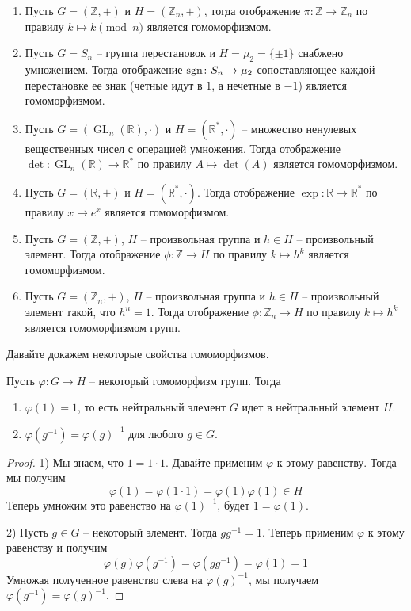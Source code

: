 \begin{examples}
\begin{enumerate}
\item Пусть $G = (\mathbb Z, +)$ и $H = (\mathbb Z_n, +)$, тогда отображение $\pi\colon \mathbb Z\to \mathbb Z_n$ по правилу $k \mapsto k \pmod n$ является гомоморфизмом.

\item Пусть $G = S_n$ -- группа перестановок и $H = \mu_2 = \{\pm 1\}$ снабжено умножением.
Тогда отображение $\operatorname{sgn} \colon S_n \to \mu_2$ сопоставляющее каждой перестановке ее знак (четные идут в $1$, а нечетные в $-1$) является гомоморфизмом.

\item Пусть $G = (\operatorname{GL}_n(\mathbb R),\cdot)$ и $H = (\mathbb R^*, \cdot)$ -- множество ненулевых вещественных чисел с операцией умножения.
Тогда отображение $\det \colon \operatorname{GL}_n(\mathbb R) \to \mathbb R^*$ по правилу $A \mapsto \det(A)$ является гомоморфизмом.

\item Пусть $G = (\mathbb R, +)$ и $H = (\mathbb R^*, \cdot)$.
Тогда отображение $\exp\colon \mathbb R\to \mathbb R^*$ по правилу $x \mapsto e^x$ является гомоморфизмом.

\item Пусть $G = (\mathbb Z, +)$, $H$ -- произвольная группа и $h\in H$ -- произвольный элемент.
Тогда отображение $\phi\colon \mathbb Z \to H$ по правилу $k \mapsto h^k$ является гомоморфизмом.

\item Пусть $G = (\mathbb Z_n, +)$, $H$ -- произвольная группа и $h\in H$ -- произвольный элемент такой, что $h^n = 1$.
Тогда отображение $\phi\colon \mathbb Z_n \to H$ по правилу $k \mapsto h^k$ является гомоморфизмом групп.
\end{enumerate}
\end{examples}

Давайте докажем некоторые свойства гомоморфизмов.

\begin{claim}
\label{claim::HomGrProp}
Пусть $\varphi\colon G\to H$ -- некоторый гомоморфизм групп.
Тогда
\begin{enumerate}
\item $\varphi(1) = 1$, то есть нейтральный элемент $G$ идет в нейтральный элемент $H$.

\item $\varphi(g^{-1}) = \varphi(g)^{-1}$ для любого $g\in G$.
\end{enumerate}
\end{claim}
\begin{proof}
1) Мы знаем, что $1 = 1 \cdot 1$.
Давайте применим $\varphi$ к этому равенству.
Тогда мы получим
\[
\varphi(1) = \varphi(1 \cdot 1) = \varphi(1) \varphi(1) \in H
\]
Теперь умножим это равенство на $\varphi(1)^{-1}$, будет $1 = \varphi(1)$.


2) Пусть $g\in G$ -- некоторый элемент.
Тогда $g g^{-1} = 1$.
Теперь применим $\varphi$ к этому равенству и получим
\[
\varphi(g) \varphi(g^{-1}) = \varphi(g g^{-1}) = \varphi(1) = 1
\]
Умножая полученное равенство слева на $\varphi(g)^{-1}$, мы получаем $\varphi(g^{-1})  = \varphi(g)^{-1}$.
\end{proof}

